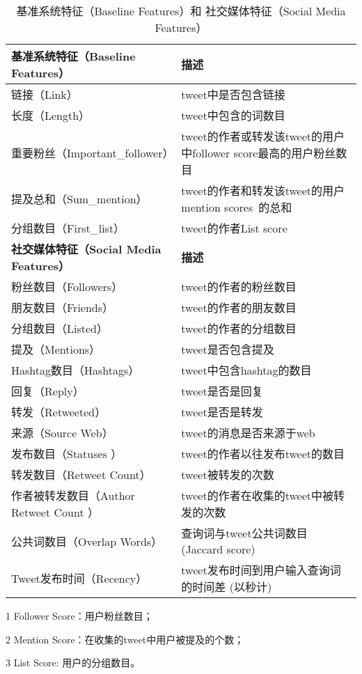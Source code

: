 \begin{table}[htp]
 \centering
 \caption{基准系统特征（Baseline Features）和 社交媒体特征（Social Media Features）}
 \label{Baseline_aaai_fea}
 \begin{threeparttable}
 \begin{tabular}{|lp{3.0in}|}
\hline
\textbf{基准系统特征（Baseline Features）} & \textbf{描述} \\
 \hline
链接（Link） & tweet中是否包含链接\\
长度（Length） & tweet中包含的词数目 \\
重要粉丝（Important\_follower）& tweet的作者或转发该tweet的用户中follower score\tnote{1}最高的用户粉丝数目\\ 
提及总和（Sum\_mention） & tweet的作者和转发该tweet的用户mention scores~\tnote{2}的总和\\ 
分组数目（First\_list） &  tweet的作者List score\tnote{3}\\ 
 \hline 
 \hline 
\textbf{ 社交媒体特征（Social Media Features）} & \textbf{描述} \\
 \hline
粉丝数目（Followers） &  tweet的作者的粉丝数目 \\
朋友数目（Friends） & tweet的作者的朋友数目 \\
分组数目（Listed） & tweet的作者的分组数目 \\
提及（Mentions）& tweet是否包含提及 \\
Hashtag数目（Hashtags） & tweet中包含hashtag的数目 \\  
回复（Reply） & tweet是否是回复 \\
转发（Retweeted） & tweet是否是转发 \\
来源（Source Web） & tweet的消息是否来源于web \\
发布数目（Statuses ） &   tweet的作者以往发布tweet的数目 \\  
转发数目（Retweet Count）& tweet被转发的次数 \\ 
作者被转发数目（Author Retweet Count ）& tweet的作者在收集的tweet中被转发的次数 \\  
公共词数目（Overlap Words） & 查询词与tweet公共词数目 (Jaccard score) \\  
Tweet发布时间（Recency）& tweet发布时间到用户输入查询词的时间差 (以秒计)\\   
 \hline
 \end{tabular}
 \begin{tablenotes}
        \footnotesize
\item[1] Follower Score：用户粉丝数目；
\item[2] Mention Score：在收集的tweet中用户被提及的个数；
\item[3] List Score: 用户的分组数目。
\end{tablenotes}
    \end{threeparttable}
\end{table}

